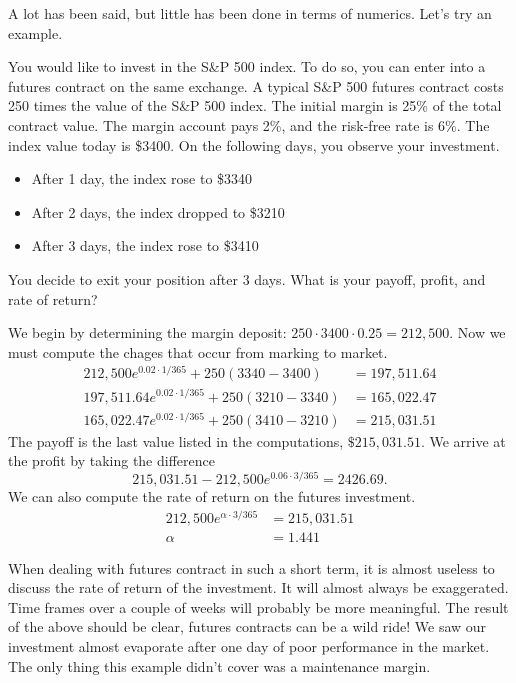 \documentclass{ximera}
\begin{document}
A lot has been said, but little has been done in terms of numerics. Let's try an example.

\begin{example}
You would like to invest in the S\&P 500 index. To do so, you can enter into a futures contract on the same exchange. A typical S\&P 500 futures contract costs 250 times the value of the S\&P 500 index. The initial margin is 25\% of the total contract value. The margin account pays 2\%, and the risk-free rate is 6\%. The index value today is \$3400. On the following days, you observe your investment.
	\begin{itemize}
	\item After 1 day, the index rose to \$3340
	\item After 2 days, the index dropped to \$3210
	\item After 3 days, the index rose to \$3410
	\end{itemize}
You decide to exit your position after 3 days. What is your payoff, profit, and rate of return?
\end{example}

\begin{solution}
We begin by determining the margin deposit: $250\cdot 3400\cdot 0.25=212,500$. Now we must compute the chages that occur from marking to market.
	\begin{align*}
	212,500e^{0.02\cdot 1/365}+250(3340-3400)&=197,511.64\\
	197,511.64e^{0.02\cdot 1/365}+250(3210-3340)&=165,022.47\\
	165,022.47e^{0.02\cdot 1/365}+250(3410-3210)&=215,031.51
	\end{align*}
The payoff is the last value listed in the computations, $\$215,031.51$. We arrive at the profit by taking the difference
	\begin{equation*}
	215,031.51-212,500e^{0.06\cdot 3/365}=2426.69.
	\end{equation*}
We can also compute the rate of return on the futures investment.
	\begin{align*}
	212,500e^{\alpha\cdot 3/365}&=215,031.51\\
	\alpha&=1.441
	\end{align*}
\end{solution}

When dealing with futures contract in such a short term, it is almost useless to discuss the rate of return of the investment. It will almost always be exaggerated. Time frames over a couple of weeks will probably be more meaningful. The result of the above should be clear, futures contracts can be a wild ride! We saw our investment almost evaporate after one day of poor performance in the market. The only thing this example didn't cover was a maintenance margin.
\end{document}

